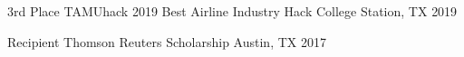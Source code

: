 

\begin{cvhonors}

  \cvhonor
  {3rd Place} %
  {TAMUhack 2019 Best Airline Industry Hack} %
  {College Station, TX} %
  {2019} %

  \cvhonor
  {Recipient} %
  {Thomson Reuters Scholarship} %
  {Austin, TX} %
  {2017} %

\end{cvhonors}
